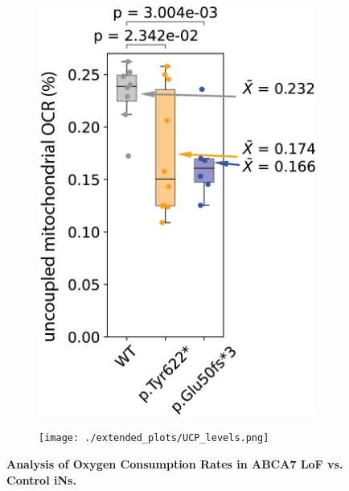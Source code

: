 \begin{figure}[H]
\begin{subfigure}[t]{0.25\textwidth}
    \end{subfigure} 
    \hspace{0.1\textwidth}
    \begin{subfigure}[t]{0.25\textwidth}
        \caption{}
        \includegraphics[width=\textwidth]{./extended_plots/uncoupling_quantification_batch2.png}        
    \end{subfigure} 
    \begin{subfigure}[t]{0.25\textwidth}
        \caption{}
        \texttt{[image: ./extended\_plots/UCP\_levels.png]}        
    \end{subfigure} 
    \caption{
         \textbf{Analysis of Oxygen Consumption Rates in ABCA7 LoF vs. Control iNs.}\\
     }
     \label{fig:oxygen_consumption_rates_iPSC_neurons}
 \end{figure}
